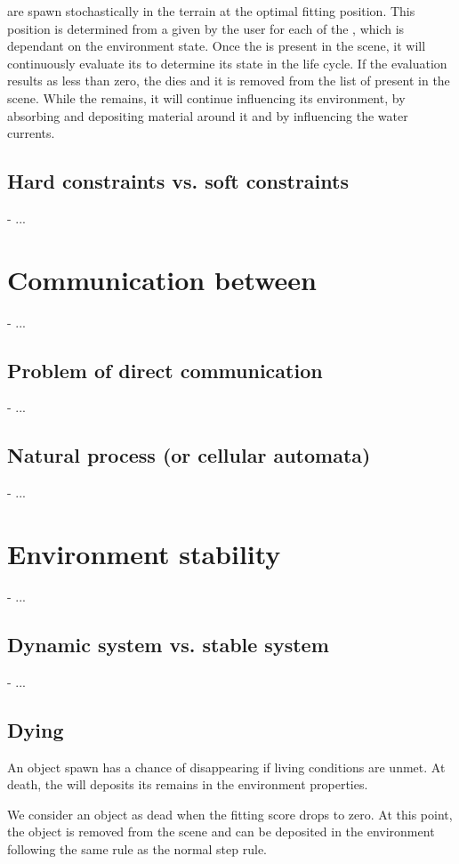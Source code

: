  are spawn stochastically in the terrain at the optimal fitting position. This position is determined from a  given by the user for each of the , which is dependant on the environment state.
Once the  is present in the scene, it will continuously evaluate its  to determine its state in the life cycle. If the evaluation results as less than zero, the  dies and it is removed from the list of  present in the scene. While the  remains, it will continue influencing its environment, by absorbing and depositing material around it and by influencing the water currents. 


\subsection{Hard constraints vs. soft constraints}
- ... 

\section{Communication between }
- ... 
\subsection{Problem of direct communication}
- ... 
\subsection{Natural process (or cellular automata)}
- ... 

\section{Environment stability}
- ... 
\subsection{Dynamic system vs. stable system}
- ... 

\subsection{Dying}
An object spawn has a chance of disappearing if living conditions are unmet. At death, the  will deposits its remains in the environment properties.

We consider an object as dead when the fitting score drops to zero.
At this point, the object is removed from the scene and  can be deposited in the environment following the same rule as the normal step rule.


